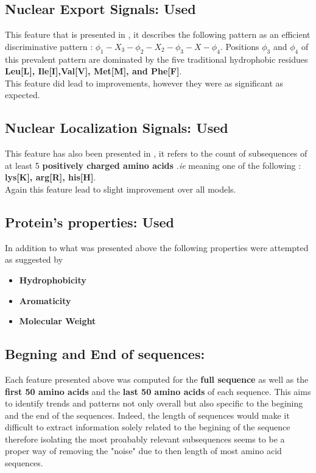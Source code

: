 \documentclass{bioinfo}
\begin{document}
\subsection{Nuclear Export Signals: \textbf{Used}}

This feature that is presented in \cite{Xua12}, it describes the following pattern as an efficient discriminative pattern : $\phi_{1}-X_3-\phi_{2}-X_2-\phi_{3}-X-\phi_{4}$. Positions $\phi_3$ and $\phi_4$ of this prevalent pattern are dominated by the five traditional hydrophobic residues \textbf{Leu[L], Ile[I],Val[V], Met[M], and Phe[F]}. \\
This feature did lead to improvements, however they were as significant as expected.

\subsection{Nuclear Localization Signals: \textbf{Used}}

This feature has also been presented in \cite{Xua12}, it refers to the count of subsequences of at least 5 \textbf{positively charged amino acids} \textit{.ie} meaning one of the following : \textbf{lys[K], arg[R], his[H]}.\\
Again this feature lead to slight improvement over all models.

\subsection{Protein's properties: \textbf{Used}}
In addition to what was presented above the following properties were attempted as suggested by \cite{gao05}
\begin{itemize}
	\item \textbf{Hydrophobicity}
	\item \textbf{Aromaticity}
	\item \textbf{Molecular Weight}
\end{itemize}

\subsection{Begning and End of sequences: }
Each feature presented above was computed for the \textbf{full sequence} as well as the \textbf{first 50 amino acids} and the \textbf{last 50 amino acids} of each sequence. This aims to identify trends and patterns not only overall but also specific to the begining and the end of the sequences. Indeed, the length of sequences would make it difficult to extract information solely related to the begining of the sequence therefore isolating the most proabably relevant subsequences seems to be a proper way of removing the "noise" due to then length of most amino acid sequences.
\end{document}
